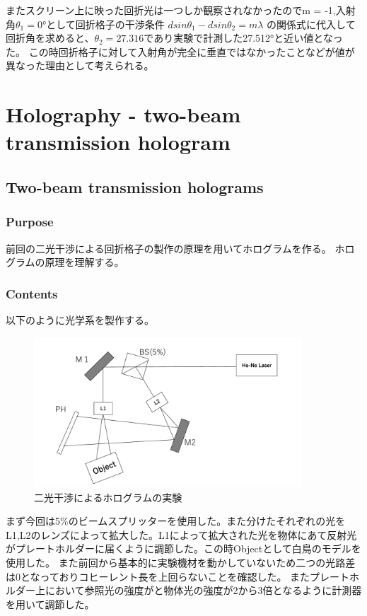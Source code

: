 \documentclass[11pt, a4paper]{jsarticle}
\begin{document}
またスクリーン上に映った回折光は一つしか観察されなかったのでm = -1,入射角$\theta_1 = 0°$として回折格子の干渉条件
$dsin\theta_1 - dsin\theta_2 = m\lambda$ の関係式に代入して回折角を求めると、$\theta_2 = 27.316$であり実験で計測した27.512°と近い値となった。
この時回折格子に対して入射角が完全に垂直ではなかったことなどが値が異なった理由として考えられる。
 \section{Holography - two-beam transmission hologram}
 \subsection{Two-beam transmission holograms}
 \subsubsection{Purpose}
 前回の二光干渉による回折格子の製作の原理を用いてホログラムを作る。
 ホログラムの原理を理解する。
 \subsubsection{Contents}
 以下のように光学系を製作する。

 \begin{figure}[htbp]
  \begin{center}
   \includegraphics[width=100mm]{fig23.png}
  \end{center}
  \caption{二光干渉によるホログラムの実験}
  \label{fig:23}
 \end{figure}

 まず今回は5\%のビームスプリッターを使用した。また分けたそれぞれの光をL1,L2のレンズによって拡大した。L1によって拡大された光を物体にあて反射光がプレートホルダーに届くように調節した。この時Objectとして白鳥のモデルを使用した。
 また前回から基本的に実験機材を動かしていないため二つの光路差は0となっておりコヒーレント長を上回らないことを確認した。
 またプレートホルダー上において参照光の強度がと物体光の強度が2から3倍となるように計測器を用いて調節した。
\end{document}

